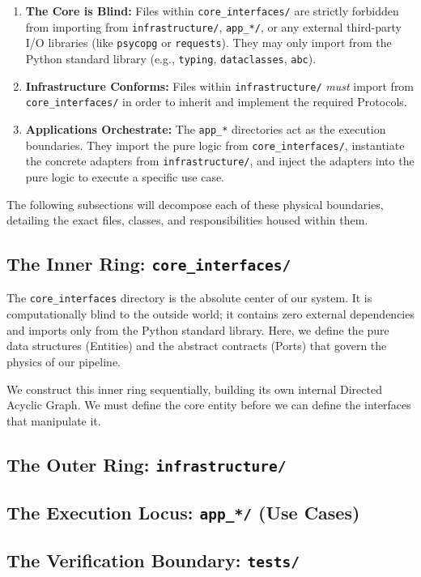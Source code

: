 \begin{enumerate}
    \item \textbf{The Core is Blind:} Files within \texttt{core\_interfaces/} are strictly forbidden from importing from \texttt{infrastructure/}, \texttt{app\_*/}, or any external third-party I/O libraries (like \texttt{psycopg} or \texttt{requests}). They may only import from the Python standard library (e.g., \texttt{typing}, \texttt{dataclasses}, \texttt{abc}).
    \item \textbf{Infrastructure Conforms:} Files within \texttt{infrastructure/} \textit{must} import from \texttt{core\_interfaces/} in order to inherit and implement the required Protocols.
    \item \textbf{Applications Orchestrate:} The \texttt{app\_*} directories act as the execution boundaries. They import the pure logic from \texttt{core\_interfaces/}, instantiate the concrete adapters from \texttt{infrastructure/}, and inject the adapters into the pure logic to execute a specific use case.
\end{enumerate}

The following subsections will decompose each of these physical boundaries, detailing the exact files, classes, and responsibilities housed within them.


\subsection{The Inner Ring: \texttt{core\_interfaces/}}

The \texttt{core\_interfaces} directory is the absolute center of our system. It is computationally blind to the outside world; it contains zero external dependencies and imports only from the Python standard library. Here, we define the pure data structures (Entities) and the abstract contracts (Ports) that govern the physics of our pipeline.

We construct this inner ring sequentially, building its own internal Directed Acyclic Graph. We must define the core entity before we can define the interfaces that manipulate it.




\subsection{The Outer Ring: \texttt{infrastructure/}}



\subsection{The Execution Locus: \texttt{app\_*/} (Use Cases)}

\subsection{The Verification Boundary: \texttt{tests/}}
